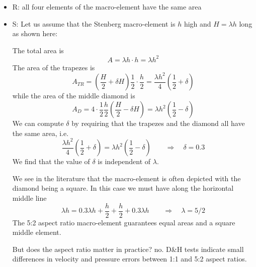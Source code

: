 \documentclass[a4paper,12pt]{article}
\begin{document}
\begin{itemize}
\item R: all four elements of the macro-element have the same area
\item S: Let us assume that the Stenberg macro-element is $h$ high and $H=\lambda h$ long
as shown here:

\begin{center}
\end{center}

The total area is 
\[
A= \lambda h \cdot h = \lambda h^2
\]
The area of the trapezes is
\[
A_{TR} = (\frac{H}{2} + \delta H)\frac12 \cdot \frac{h}{2}=\frac{\lambda h^2}{4} \left(\frac12 + \delta \right)
\]
while the area of the middle diamond is
\[
A_D = 4 \cdot \frac12 \frac{h}{2} \left(\frac{H}{2}-\delta H \right) 
= \lambda h^2 \left(\frac12 - \delta \right)
\]
We can compute $\delta$ by requiring that the trapezes and the diamond all 
have the same area, i.e.
\[
\frac{\lambda h^2}{4} (\frac12 + \delta)
=
\lambda h^2 (\frac12 - \delta)
\qquad
\Rightarrow \quad \delta = 0.3
\]
We find that the value of $\delta$ is independent of $\lambda$.

We see in the literature \cite{sten84,brfo,chba93}  that the 
macro-element is often depicted with the diamond being a square.
In this case we must have along the horizontal middle line
\[
\lambda h = 0.3 \lambda h + \frac{h}{2}+ \frac{h}{2} + 0.3 \lambda h
\qquad
\Rightarrow \quad 
\lambda=5/2
\]
The 5:2 aspect ratio macro-element guarantees equal areas and a square middle element.

But does the aspect ratio matter in practice? no. D\&H tests indicate
small differences in velocity and pressure errors between 1:1 and 5:2 aspect ratios.


\end{itemize}
\end{document}
